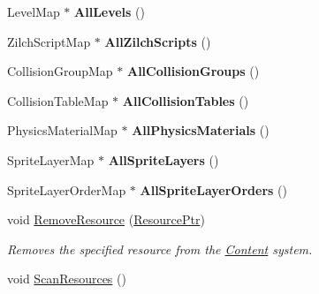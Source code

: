 \begin{DoxyCompactItemize}
\item 
\hypertarget{classDCEngine_1_1Systems_1_1Content_ad9d9e8bb3a72f504fb10790d5f917aea}{Level\-Map $\ast$ {\bfseries All\-Levels} ()}\label{classDCEngine_1_1Systems_1_1Content_ad9d9e8bb3a72f504fb10790d5f917aea}

\item 
\hypertarget{classDCEngine_1_1Systems_1_1Content_a498ac3c8a0ec969965f5d05090eada9f}{Zilch\-Script\-Map $\ast$ {\bfseries All\-Zilch\-Scripts} ()}\label{classDCEngine_1_1Systems_1_1Content_a498ac3c8a0ec969965f5d05090eada9f}

\item 
\hypertarget{classDCEngine_1_1Systems_1_1Content_afe1e7e9e1cd4b195dc9a3d14fee1d6e1}{Collision\-Group\-Map $\ast$ {\bfseries All\-Collision\-Groups} ()}\label{classDCEngine_1_1Systems_1_1Content_afe1e7e9e1cd4b195dc9a3d14fee1d6e1}

\item 
\hypertarget{classDCEngine_1_1Systems_1_1Content_a4f460ebb3de14bae3e3eb6932516beb4}{Collision\-Table\-Map $\ast$ {\bfseries All\-Collision\-Tables} ()}\label{classDCEngine_1_1Systems_1_1Content_a4f460ebb3de14bae3e3eb6932516beb4}

\item 
\hypertarget{classDCEngine_1_1Systems_1_1Content_aeff0a7a11ca423a6d80122077e06d05d}{Physics\-Material\-Map $\ast$ {\bfseries All\-Physics\-Materials} ()}\label{classDCEngine_1_1Systems_1_1Content_aeff0a7a11ca423a6d80122077e06d05d}

\item 
\hypertarget{classDCEngine_1_1Systems_1_1Content_a3392da5a6817fb1a885302a155fb7432}{Sprite\-Layer\-Map $\ast$ {\bfseries All\-Sprite\-Layers} ()}\label{classDCEngine_1_1Systems_1_1Content_a3392da5a6817fb1a885302a155fb7432}

\item 
\hypertarget{classDCEngine_1_1Systems_1_1Content_a0fb0e44d3c2f886983090cc0023712e2}{Sprite\-Layer\-Order\-Map $\ast$ {\bfseries All\-Sprite\-Layer\-Orders} ()}\label{classDCEngine_1_1Systems_1_1Content_a0fb0e44d3c2f886983090cc0023712e2}

\item 
void \hyperlink{classDCEngine_1_1Systems_1_1Content_a85636619434d7d8b6bea0266bccac31c}{Remove\-Resource} (\hyperlink{classDCEngine_1_1Resource}{Resource\-Ptr})
\begin{DoxyCompactList}\small\item\em Removes the specified resource from the \hyperlink{classDCEngine_1_1Systems_1_1Content}{Content} system. \end{DoxyCompactList}\item 
\hypertarget{classDCEngine_1_1Systems_1_1Content_a2c182c608f472d5d154d0a770c7f041f}{void \hyperlink{classDCEngine_1_1Systems_1_1Content_a2c182c608f472d5d154d0a770c7f041f}{Scan\-Resources} ()}\label{classDCEngine_1_1Systems_1_1Content_a2c182c608f472d5d154d0a770c7f041f}


\end{DoxyCompactItemize}
